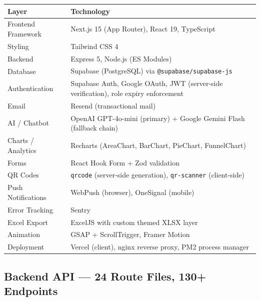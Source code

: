 \documentclass[12pt,a4paper]{article}
\begin{document}
\begin{tabularx}{\textwidth}{L{3.5cm} X}
\toprule
{}
\textbf{Layer} & \textbf{Technology} \\
\midrule
Frontend Framework & Next.js 15 (App Router), React 19, TypeScript \\
Styling & Tailwind CSS 4 \\
Backend & Express 5, Node.js (ES Modules) \\
Database & Supabase (PostgreSQL) via \texttt{@supabase/supabase-js} \\
Authentication & Supabase Auth, Google OAuth, JWT (server-side verification), role expiry enforcement \\
Email & Resend (transactional mail) \\
AI / Chatbot & OpenAI GPT-4o-mini (primary) + Google Gemini Flash (fallback chain) \\
Charts / Analytics & Recharts (AreaChart, BarChart, PieChart, FunnelChart) \\
Forms & React Hook Form + Zod validation \\
QR Codes & \texttt{qrcode} (server-side generation), \texttt{qr-scanner} (client-side) \\
Push Notifications & WebPush (browser), OneSignal (mobile) \\
Error Tracking & Sentry \\
Excel Export & ExcelJS with custom themed XLSX layer \\
Animation & GSAP + ScrollTrigger, Framer Motion \\
Deployment & Vercel (client), nginx reverse proxy, PM2 process manager \\
\bottomrule
\end{tabularx}

\subsection{Backend API — 24 Route Files, 130+ Endpoints}
\end{document}
